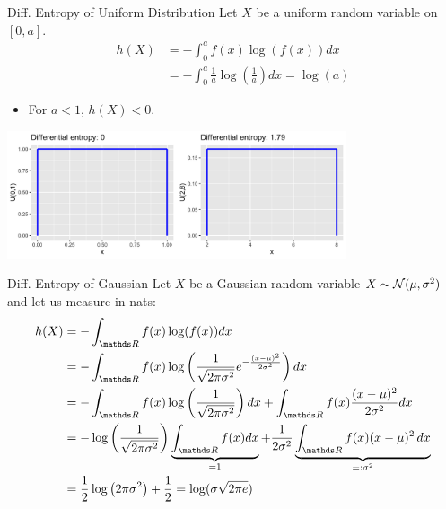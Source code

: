 \documentclass[11pt,compress,t,notes=noshow, xcolor=table]{beamer}
\begin{document}
\begin{vbframe}{Diff. Entropy of Uniform Distribution}
Let $X$ be a uniform random variable on $[0, a]$.
  \begin{equation*}
    \begin{aligned} 
      h(X) &= - \int_0^a f(x) \log(f(x)) dx \\
           &= - \int_0^a \frac{1}{a} \log\left(\frac{1}{a}\right) dx = \log(a) 
    \end{aligned}
  \end{equation*}
  \begin{itemize}
    \item For $a < 1$, $h(X) < 0$.
    \end{itemize}
    
    \begin{center}
    \includegraphics[width = 10cm ]{figure/uni_entropy.png}
    \end{center}
    
\end{vbframe}


\begin{vbframe}{Diff. Entropy of Gaussian}
Let $X$ be a Gaussian random variable $X \sim \mathcal{N}(\mu, \sigma^2)$ and let us measure in nats:
  \begin{equation*}
    \begin{aligned} 
     h(X) &= - \int_{\R} f(x) \log(f(x)) dx \\
          &=  - \int_{\R} f(x) \log\left(\frac{1}{\sqrt{2 \pi \sigma^{2}}} e^{-\frac{(x-\mu)^{2}}{2 \sigma^{2}}} \right) dx \\
          &= - \int_{\R} f(x) \log\left(\frac{1}{\sqrt{2 \pi \sigma^{2}}}\right) dx + \int_{\R} f(x) \frac{(x-\mu)^{2}}{2 \sigma^{2}} dx \\
          &= - \log \left(\frac{1}{\sqrt{2 \pi \sigma^{2}}}\right) \underbrace{\int_{\R} f(x) dx}_{= 1} + \frac{1}{2\sigma^2} \underbrace{\int_{\R} f(x) (x-\mu)^{2}\,dx}_{=: \sigma^2} \\
          &= \frac{1}{2} \log \left(2 \pi \sigma^{2}\right) + \frac{1}{2} =  \log(\sigma \sqrt{2\pi e})
    \end{aligned}
  \end{equation*}
\end{vbframe}
\end{document}
